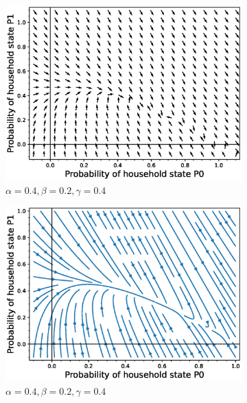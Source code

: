 \documentclass[paper=a4, fontsize=11pt, twoside, BCOR=12mm, parskip=full, listof=totoc]{scrreprt}
\begin{document}
{\begin{figure}[H]
\begin{subfigure}[b]{0.4\linewidth}
	  \includegraphics[width=\linewidth]{phase_portrait/033_a1.eps}
	  \caption{\(\alpha=0.4, \beta=0.2, \gamma=0.4\)}
	  \label{gamma four phasevectorfield}
	\end{subfigure}
	\begin{subfigure}[b]{0.4\linewidth}
	  \includegraphics[width=\linewidth]{phase_portrait/033_a1s.eps}
	  \caption{\(\alpha=0.4, \beta=0.2, \gamma=0.4\)}
	  \label{gamma four phasestreamplot}
	\end{subfigure}
	\begin{subfigure}[b]{0.4\linewidth}

\end{subfigure}
\end{figure}}
\end{document}
